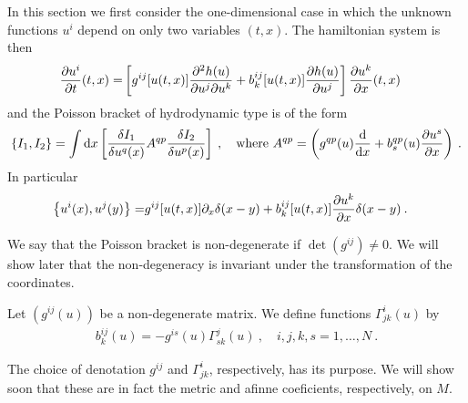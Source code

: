 In this section we first consider the one-dimensional case in which the unknown functions $u^i$ depend on only two variables $(t,x)$. The hamiltonian system is then
\begin{align}
    \frac{\partial u^i}{\partial t} (t,x) =&
    \left[ g^{ij} [u(t,x)] \frac{\partial^2 h(u)}{\partial u^j \partial u^k} + b_k^{ij} [u(t,x)] \frac{\partial h(u)}{\partial u^j} \right] \frac{\partial u^k}{\partial x}(t,x) 
\end{align}
and the Poisson bracket of hydrodynamic type is of the form
\begin{align}
    \left \lbrace I_1,I_2 \right \rbrace = \int \mathrm{d} x
    \left[ \frac{\delta I_1}{\delta u^q(x)} A^{qp} \frac{\delta I_2}{\delta u^p(x)} \right] \:,\quad \text{where } A^{qp} = \left( g^{qp}(u) \frac{\mathrm{d}}{\mathrm{d}x} + b^{qp}_s(u) \frac{\partial u^s}{\partial x} \right) \:.
\end{align}
In particular
\begin{align}
    \label{eq:Poisson1D}
    \left \lbrace u^i(x), u^j(y) \right \rbrace =& g^{ij} [u(t,x)] \partial_x \delta(x-y) + b_k^{ij} [u(t,x)] \frac{\partial u^k}{\partial x} \delta(x-y) \:. 
\end{align}

We say that the Poisson bracket is non-degenerate if $\det(g^{ij}) \neq 0$. We will show later that the non-degeneracy is invariant under the transformation of the coordinates.

\begin{definition}
    Let $(g^{ij}(u))$ be a non-degenerate matrix. We define functions $\Gamma^{i}_{jk}(u)$ by
        \begin{align}
            b_k^{ij}(u) = -g^{is}(u) \Gamma^j_{sk}(u) \:, \quad i,j,k,s=1,\dots,N \:. \label{eq:definice-Gamma}
        \end{align}
\end{definition}

The choice of denotation $g^{ij}$ and $\Gamma^{i}_{jk}$, respectively, has its purpose. We will show soon that these are in fact the metric and afinne coeficients, respectively, on $M$.

